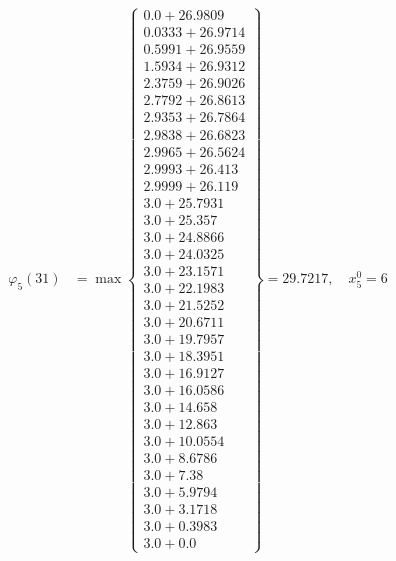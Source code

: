 \documentclass{article}
\begin{document}
\begin{align*}
  
\varphi_{5}(31) &= \max \left\{ \begin{array}{c}
0.0 + 26.9809 \\
 0.0333 + 26.9714 \\
 0.5991 + 26.9559 \\
 1.5934 + 26.9312 \\
 2.3759 + 26.9026 \\
 2.7792 + 26.8613 \\
 2.9353 + 26.7864 \\
 2.9838 + 26.6823 \\
 2.9965 + 26.5624 \\
 2.9993 + 26.413 \\
 2.9999 + 26.119 \\
 3.0 + 25.7931 \\
 3.0 + 25.357 \\
 3.0 + 24.8866 \\
 3.0 + 24.0325 \\
 3.0 + 23.1571 \\
 3.0 + 22.1983 \\
 3.0 + 21.5252 \\
 3.0 + 20.6711 \\
 3.0 + 19.7957 \\
 3.0 + 18.3951 \\
 3.0 + 16.9127 \\
 3.0 + 16.0586 \\
 3.0 + 14.658 \\
 3.0 + 12.863 \\
 3.0 + 10.0554 \\
 3.0 + 8.6786 \\
 3.0 + 7.38 \\
 3.0 + 5.9794 \\
 3.0 + 3.1718 \\
 3.0 + 0.3983 \\
 3.0 + 0.0
\end{array} \right\}=29.7217,\quad x_{5}^0=6\\
  
  
  

\end{align*}
\end{document}

